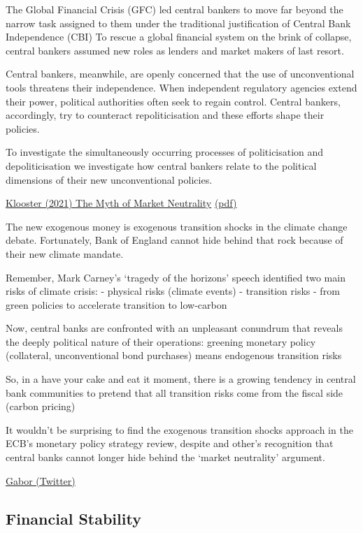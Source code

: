 \documentclass[
]{book}
\begin{document}
The Global Financial Crisis (GFC) led central bankers to move far beyond the narrow task assigned
to them under the traditional justification of Central Bank Independence (CBI)
To rescue a global financial system on the brink of collapse, central bankers assumed new roles as lenders and market makers of last resort.

Central bankers, meanwhile, are openly concerned that the use of unconventional tools threatens
their independence.
When independent regulatory agencies extend their power, political authorities often seek to regain
control.
Central bankers, accordingly, try to counteract repoliticisation and these efforts
shape their policies.

To investigate the simultaneously occurring processes of politicisation and depoliticisation
we investigate how central bankers relate to the political dimensions of their
new unconventional policies.

\href{https://www.tandfonline.com/doi/epub/10.1080/13563467.2019.1657077?needAccess=true}{Klooster (2021) The Myth of Market Neutrality}
\href{pdf/Klooster_2021_Myth_of_Market_Neutrality.pdf}{(pdf)}

The new exogenous money is exogenous transition shocks in the climate change debate.
Fortunately, Bank of England cannot hide behind that rock because of their new climate mandate.

Remember, Mark Carney's `tragedy of the horizons' speech identified two main risks of climate crisis:
- physical risks (climate events)
- transition risks - from green policies to accelerate transition to low-carbon

Now, central banks are confronted with an unpleasant conundrum that reveals the deeply political nature of their operations:
greening monetary policy (collateral, unconventional bond purchases) means endogenous transition risks

So, in a have your cake and eat it moment, there is a growing tendency in central bank communities to pretend that all transition risks come from the fiscal side (carbon pricing)

It wouldn't be surprising to find the exogenous transition shocks approach in the ECB's monetary policy strategy review, despite \citet{Lagarde}
and other's recognition that central banks cannot longer hide behind the `market neutrality' argument.

\href{https://twitter.com/DanielaGabor/status/1384837864412917765}{Gabor (Twitter)}

\hypertarget{financial-stability}{%
\subsection{Financial Stability}\label{financial-stability}}
\end{document}
